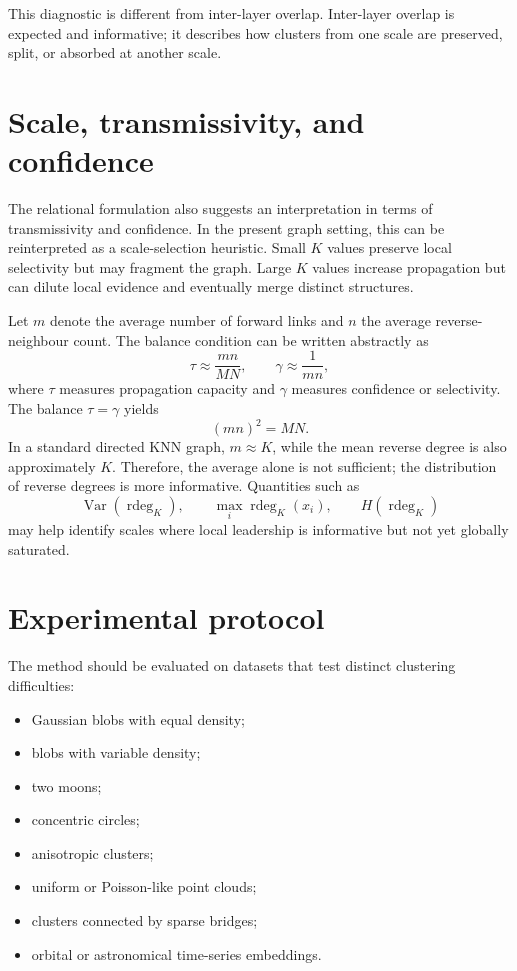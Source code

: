 \documentclass[pdflatex,sn-mathphys-num]{sn-jnl}
\newcommand{\rdeg}{\operatorname{rdeg}}
\begin{document}
This diagnostic is different from inter-layer overlap. Inter-layer overlap is expected and informative; it describes how clusters from one scale are preserved, split, or absorbed at another scale.

\section{Scale, transmissivity, and confidence}\label{sec:scale}

The relational formulation also suggests an interpretation in terms of transmissivity and confidence. In the present graph setting, this can be reinterpreted as a scale-selection heuristic. Small $K$ values preserve local selectivity but may fragment the graph. Large $K$ values increase propagation but can dilute local evidence and eventually merge distinct structures.

Let $m$ denote the average number of forward links and $n$ the average reverse-neighbour count. The balance condition can be written abstractly as
\begin{equation}
\tau\approx \frac{mn}{MN},\qquad \gamma\approx\frac{1}{mn},
\end{equation}
where $\tau$ measures propagation capacity and $\gamma$ measures confidence or selectivity. The balance $\tau=\gamma$ yields
\begin{equation}
(mn)^2=MN.
\end{equation}
In a standard directed KNN graph, $m\approx K$, while the mean reverse degree is also approximately $K$. Therefore, the average alone is not sufficient; the distribution of reverse degrees is more informative. Quantities such as
\begin{equation}
\operatorname{Var}(\rdeg_K),\qquad \max_i\rdeg_K(x_i),\qquad H(\rdeg_K)
\end{equation}
may help identify scales where local leadership is informative but not yet globally saturated.

\section{Experimental protocol}\label{sec:experimental_protocol}

The method should be evaluated on datasets that test distinct clustering difficulties:
\begin{itemize}
    \item Gaussian blobs with equal density;
    \item blobs with variable density;
    \item two moons;
    \item concentric circles;
    \item anisotropic clusters;
    \item uniform or Poisson-like point clouds;
    \item clusters connected by sparse bridges;
    \item orbital or astronomical time-series embeddings.
\end{itemize}
\end{document}
